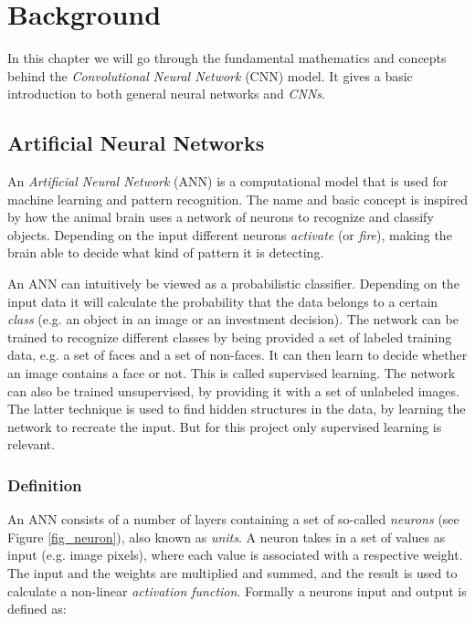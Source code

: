 \chapter{Background} \label{chap_background}

In this chapter we will go through the fundamental mathematics and concepts behind the \textit{Convolutional Neural Network} (CNN) model. It gives a basic introduction to both general neural networks and \textit{CNNs}.

\section{Artificial Neural Networks}\label{ann}

An \textit{Artificial Neural Network} (ANN) \cite{Minsky1969}\cite{Bishop2006} is a computational model that is used for machine learning and pattern recognition. The name and basic concept is inspired by how the animal brain uses a network of neurons to recognize and classify objects. Depending on the input different neurons \textit{activate} (or \textit{fire}), making the brain able to decide what kind of pattern it is detecting. 

An ANN can intuitively be viewed as a probabilistic classifier. Depending on the input data it will calculate the probability that the data belongs to a certain \textit{class} (e.g. an object in an image or an investment decision). The network can be trained to recognize different classes by being provided a set of labeled training data, e.g. a set of faces and a set of non-faces. It can then learn to decide whether an image contains a face or not. This is called supervised learning. The network can also be trained unsupervised, by providing it with a set of unlabeled images. The latter technique is used to find hidden structures in the data, by learning the network to recreate the input. But for this project only supervised learning is relevant.  

\subsection{Definition} \hfill \break
An ANN  consists of a number of layers containing a set of so-called \textit{neurons} (see Figure \ref{fig_neuron}), also known as \textit{units}. A neuron takes in a set of values as input (e.g. image pixels), where each value is associated with a respective weight. The input and the weights are multiplied and summed, and the result is used to calculate a non-linear \textit{activation function}. Formally a neurons input and output is defined as:


